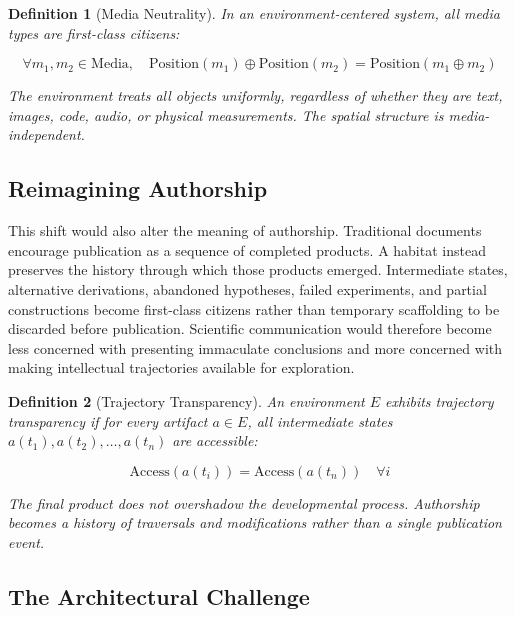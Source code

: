 \documentclass[12pt,oneside]{article}
\newtheorem{definition}{Definition}[section]
\theoremstyle{remark}
\begin{document}
\begin{definition}[Media Neutrality]
In an environment-centered system, all media types are first-class citizens:

\begin{equation}
\forall m_1, m_2 \in \text{Media}, \quad \text{Position}(m_1) \oplus \text{Position}(m_2) = \text{Position}(m_1 \oplus m_2)
\end{equation}

The environment treats all objects uniformly, regardless of whether they are text, images, code, audio, or physical measurements. The spatial structure is media-independent.
\end{definition}

\subsection{Reimagining Authorship}

This shift would also alter the meaning of authorship. Traditional documents encourage publication as a sequence of completed products. A habitat instead preserves the history through which those products emerged. Intermediate states, alternative derivations, abandoned hypotheses, failed experiments, and partial constructions become first-class citizens rather than temporary scaffolding to be discarded before publication. Scientific communication would therefore become less concerned with presenting immaculate conclusions and more concerned with making intellectual trajectories available for exploration.

\begin{definition}[Trajectory Transparency]
An environment $E$ exhibits trajectory transparency if for every artifact $a \in E$, all intermediate states $a(t_1), a(t_2), \ldots, a(t_n)$ are accessible:

\begin{equation}
\text{Access}(a(t_i)) = \text{Access}(a(t_n)) \quad \forall i
\end{equation}

The final product does not overshadow the developmental process. Authorship becomes a history of traversals and modifications rather than a single publication event.
\end{definition}

\subsection{The Architectural Challenge}
\end{document}

